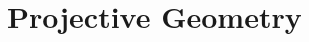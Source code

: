 \section{Projective Geometry}



\begin{comment}


Homogene Koordinaten (für die Computergrafik)
https://www.youtube.com/watch?v=dCQzgvwxpvs

\end{comment}